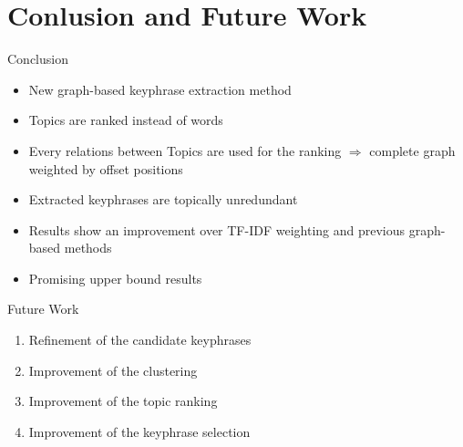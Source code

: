 \section{Conlusion and Future Work}
  \begin{frame}{Conclusion}
    \begin{itemize}
      \item{New graph-based keyphrase extraction method}
      \item{Topics are ranked instead of words}
      \item{Every relations between Topics are used for the ranking
            $\Rightarrow$ complete graph weighted by offset positions}
      \item{Extracted keyphrases are topically unredundant}
      \item{Results show an improvement over TF-IDF weighting and previous
            graph-based methods}
      \item{Promising upper bound results}
    \end{itemize}
  \end{frame}

  \begin{frame}{Future Work}
    \begin{enumerate}
      \item{Refinement of the candidate keyphrases}
      \item{Improvement of the clustering}
      \item{Improvement of the topic ranking}
      \item{Improvement of the keyphrase selection}
    \end{enumerate}
  \end{frame}

